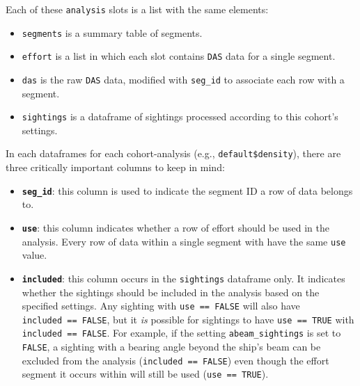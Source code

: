 \documentclass[
]{book}
\newenvironment{Shaded}{\begin{snugshade}}{\end{snugshade}}
\newcommand{\DecValTok}[1]{\textcolor[rgb]{0.00,0.00,0.81}{#1}}
\newcommand{\NormalTok}[1]{#1}
\newcommand{\OperatorTok}[1]{\textcolor[rgb]{0.81,0.36,0.00}{\textbf{#1}}}
\newcommand{\StringTok}[1]{\textcolor[rgb]{0.31,0.60,0.02}{#1}}
\begin{document}
Each of these \texttt{analysis} slots is a list with the same elements:

\begin{Shaded}
\end{Shaded}

\begin{itemize}
\item
  \texttt{segments} is a summary table of segments.
\item
  \texttt{effort} is a list in which each slot contains \texttt{DAS} data for a single segment.
\item
  \texttt{das} is the raw \texttt{DAS} data, modified with \texttt{seg\_id} to associate each row with a segment.
\item
  \texttt{sightings} is a dataframe of sightings processed according to this cohort's settings.
\end{itemize}

In each dataframes for each cohort-analysis (e.g., \texttt{default\$density}), there are three critically important columns to keep in mind:

\begin{itemize}
\item
  \textbf{\texttt{seg\_id}}: this column is used to indicate the segment ID a row of data belongs to.
\item
  \textbf{\texttt{use}}: this column indicates whether a row of effort should be used in the analysis. Every row of data within a single segment with have the same \texttt{use} value.
\item
  \textbf{\texttt{included}}: this column occurs in the \texttt{sightings} dataframe only. It indicates whether the sightings should be included in the analysis based on the specified settings. Any sighting with \texttt{use\ ==\ FALSE} will also have \texttt{included\ ==\ FALSE}, but it \emph{is} possible for sightings to have \texttt{use\ ==\ TRUE} with \texttt{included\ ==\ FALSE}. For example, if the setting \texttt{abeam\_sightings} is set to \texttt{FALSE}, a sighting with a bearing angle beyond the ship's beam can be excluded from the analysis (\texttt{included\ ==\ FALSE}) even though the effort segment it occurs within will still be used (\texttt{use\ ==\ TRUE}).
\end{itemize}
\end{document}
